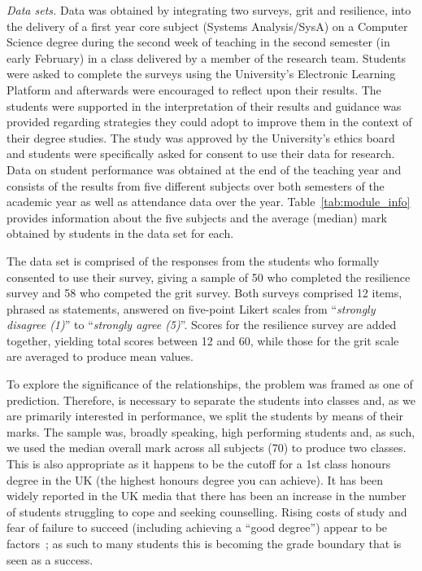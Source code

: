 \documentclass[sigconf]{acmart}
\begin{document}
{\em Data sets.}
Data was obtained by integrating two surveys, grit and resilience, into the delivery of a first year core subject (Systems Analysis/SysA) on a Computer Science degree during the second week of teaching in the second semester (in early February) in a class delivered by a member of the research team. Students were asked to complete the surveys using the University's Electronic Learning Platform and afterwards were encouraged to reflect upon their results. The students were supported in the interpretation of their results and guidance was provided regarding strategies they could adopt to improve them in the context of their degree studies. The study was approved by the University's ethics board and students were specifically asked for consent to use their data for research. Data on student performance was obtained at the end of the teaching year and consists of the results from five different subjects over both semesters of the academic year as well as attendance data over the year. Table~\ref{tab:module_info} provides information about the five subjects and the average (median) mark obtained by students in the data set for each.

The data set is comprised of the responses from the students who formally consented to use their survey, giving a sample of 50 who completed the resilience survey and 58 who competed the grit survey. Both surveys comprised 12 items, phrased as statements, answered on five-point Likert scales from ``{\emph{strongly disagree (1)}}'' to ``{\emph{strongly agree (5)}}''. Scores for the resilience survey are added together, yielding total scores between 12 and 60, while those for the grit scale are averaged to produce mean values.

To explore the significance of the relationships, the problem was framed as one of prediction. Therefore, is necessary to separate the students into classes and, as we are primarily interested in performance, we split the students by means of their marks. The sample was, broadly speaking, high performing students and, as such, we used the median overall mark across all subjects (70) to produce two classes. This is also appropriate as it happens to be the cutoff for a 1st class honours degree in the UK (the highest honours degree you can achieve). It has been widely reported in the UK media that there has been an increase in the number of students struggling to cope and seeking counselling. Rising costs of study and fear of failure to succeed (including achieving a ``good degree'') appear to be factors~\cite{BBC}; as such to many students this is becoming the grade boundary that is seen as a success.
\end{document}

